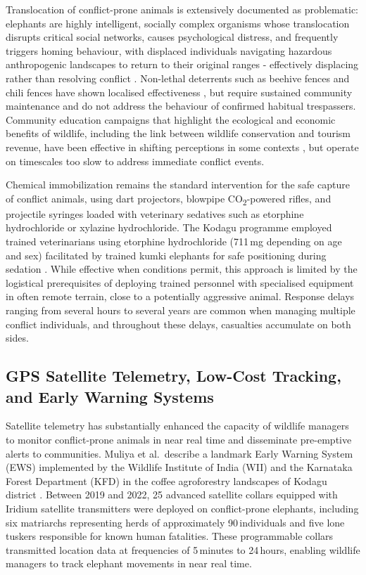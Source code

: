 \documentclass[12pt,a4paper]{article}
\begin{document}
    Translocation of conflict-prone animals is extensively documented as problematic: elephants
    are highly intelligent, socially complex organisms whose translocation disrupts critical social
    networks, causes psychological distress, and frequently triggers homing behaviour, with
    displaced individuals navigating hazardous anthropogenic landscapes to return to their
    original ranges - effectively displacing rather than resolving conflict \cite{muliya2026}.
    Non-lethal deterrents such as beehive fences and chili fences have shown localised
    effectiveness \cite{mbiki2025}, but require sustained community maintenance and do not
    address the behaviour of confirmed habitual trespassers. Community education campaigns
    that highlight the ecological and economic benefits of wildlife, including the link between
    wildlife conservation and tourism revenue, have been effective in shifting perceptions in
    some contexts \cite{mbiki2025,basak2023}, but operate on timescales too slow to address
    immediate conflict events.

    Chemical immobilization remains the standard intervention for the safe capture of conflict
    animals, using dart projectors, blowpipe CO\textsubscript{2}-powered rifles, and projectile
    syringes loaded with veterinary sedatives such as etorphine hydrochloride or xylazine
    hydrochloride. The Kodagu programme employed trained veterinarians using etorphine
    hydrochloride (711\,mg depending on age and sex) facilitated by trained kumki elephants
    for safe positioning during sedation \cite{muliya2026}. While effective when conditions
    permit, this approach is limited by the logistical prerequisites of deploying trained personnel
    with specialised equipment in often remote terrain, close to a potentially aggressive animal.
    Response delays ranging from several hours to several years are common when managing
    multiple conflict individuals, and throughout these delays, casualties accumulate on both
    sides.

    \subsection{GPS Satellite Telemetry, Low-Cost Tracking, and Early Warning Systems}

    Satellite telemetry has substantially enhanced the capacity of wildlife managers to monitor
    conflict-prone animals in near real time and disseminate pre-emptive alerts to communities.
    Muliya et al.\ describe a landmark Early Warning System (EWS) implemented by the Wildlife
    Institute of India (WII) and the Karnataka Forest Department (KFD) in the coffee
    agroforestry landscapes of Kodagu district \cite{muliya2026}. Between 2019 and 2022,
    25 advanced satellite collars equipped with Iridium satellite transmitters were deployed
    on conflict-prone elephants, including six matriarchs representing herds of approximately
    90\,individuals and five lone tuskers responsible for known human fatalities. These
    programmable collars transmitted location data at frequencies of 5\,minutes to 24\,hours,
    enabling wildlife managers to track elephant movements in near real time.
\end{document}
